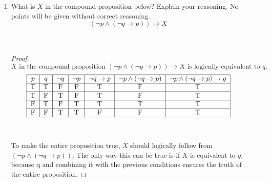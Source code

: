 \documentclass[11pt]{article}
\begin{document}
\begin{enumerate}
\begin{enumerate}
  \end{enumerate}

\newpage
\item What is $X$ in the compound proposition below? Explain
  your reasoning. No points will be given without correct reasoning.
  \[ (\neg p \land (\neg q \rightarrow p)) \rightarrow X\]\\
  \\
  \begin{proof}
      \(X \text{ in the compound proposition } (\neg p \land (\neg q \rightarrow p)) \rightarrow X \text{ is logically equivalent to } q.\) 
\\

\[
\begin{tabular}{|c|c|c|c|c|c|c|}
\hline
$p$  & $q$ & $\neg q$ & $\neg p$ &$\neg q\rightarrow p$ &$\neg p \land (\neg q \rightarrow p)$ & $\neg p \land (\neg q \rightarrow p) \rightarrow q$  \\
\hline
T & T & F & F & T & F & T \\
\hline
T & F & T & F & T & F & T\\
\hline
F & T & F & T & T & T & T\\
\hline
F & F & T & T & F & F & T\\
\hline
\end{tabular}
\]\\
\\

To make the entire proposition true, \(X\) should logically follow from \( (\neg p \land (\neg q \rightarrow p)) \). The only way this can be true is if \(X\) is equivalent to \( q \), because q and combining it with the previous conditions ensures the truth of the entire proposition.
  \end{proof}
      
 





\end{enumerate}
\end{document}
